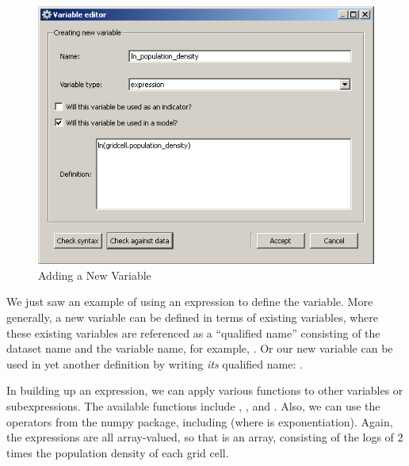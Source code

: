 \begin{figure}[htp]
\begin{center}
\includegraphics[scale=0.6]{part-gui/images/model-manager-variable-library-new-variable.png}
\end{center}
\caption{Adding a New Variable}
\label{fig:variable-library-new-variable}
\end{figure}

We just saw an example of using an expression to define the 
 variable.  More generally, a new
variable can be defined in terms of existing variables, where these
existing variables are referenced as a ``qualified name'' consisting of the
dataset name and the variable name, for example, 
.  Or our new variable can be used
in yet another definition by writing \emph{its} qualified name: 
.

In building up an expression, we can apply various functions to other
variables or subexpressions.  The available functions include ,
, and .  Also, we can use the operators from the numpy
package, including \code{+ - * / **} (where \code{ **} is exponentiation).
Again, the expressions are all array-valued, so that 
 is an array, 
consisting of the logs of 2 times the population density of each grid cell.
